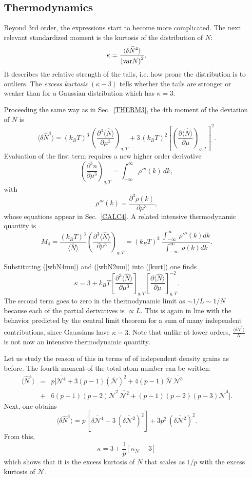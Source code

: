 \documentclass[aps,twocolumn,pra,superscriptaddress,nofootinbib,amsmath,amssymb,floats,floatfix,english]{revtex4-1}
\newcommand{\op}[1]{\widehat{#1}}
\newcommand{\mc}[1]{{\mathcal{#1}}}
\newcommand{\wb}[1]{{\overline{#1}}}
\newcommand{\nonu}{\nonumber}
\newcommand{\eqn}[1]{(\ref{#1})}
\renewcommand{\eq}[2]{\begin{equation}\label{#1}#2\end{equation}}
\newcommand{\eqa}[2]{\begin{eqnarray}#2\label{#1}\end{eqnarray}}
\begin{document}
\subsection{Thermodynamics}
\label{THERM4}
Beyond 3rd order, the expressions start to become more complicated. 
The next relevant standardized moment is the kurtosis of the distribution of $N$: 
\eq{kurt}{
\kappa =\frac{\langle\delta\op{N}^4\rangle}{\left({\rm var} N\right)^2}.
}
It describes the relative strength of the tails, i.e. how prone the distribution is to outliers. The \emph{excess kurtosis} $(\kappa-3)$ tells
whether the tails are stronger or weaker than for a Gaussian distribution which has $\kappa=3$.

Proceeding the same way as in Sec.~\ref{THERM3}, the 4th moment of the deviation of $N$ is 
\eq{wbN4mu}{
\langle\delta \op{N}^4\rangle = (k_BT)^3\,\left(\frac{\partial^3\langle \op{N}\rangle}{\partial\mu^3}\right)_{g,T} + 3\,(k_BT)^2\left[\left(\frac{\partial\langle \op{N}\rangle}{\partial\mu}\right)_{g,T}\right]^2.
}
Evaluation of the first term requires a new higher order derivative
\eq{dndu3}{
\left(\frac{\partial^3 n}{\partial\mu^3}\right)_{g,T} = \int_{-\infty}^{\infty} \rho'''(k)\, dk,
}
with
\eq{dpdu3}{
\rho'''(k) = \frac{\partial^3\rho(k)}{\partial\mu^3},
}
whose equations appear in Sec.~\ref{CALC4}. 
A related intensive thermodynamic quantity is 
\eq{Th4}{
M_4 = \frac{(k_BT)^3}{\langle \op{N}\rangle} \left(\frac{\partial^3\langle \op{N}\rangle}{\partial\mu^3}\right)_{g,T} = (k_BT)^3\ \frac{\int_{-\infty}^{\infty}\ \rho'''(k) dk}{\int_{-\infty}^{\infty}\ \rho(k) dk}.
}



Substituting \eqn{wbN4mu} and \eqn{wbN2mu} into \eqn{kurt} one finds
\eq{kurt2}{
\kappa = 3 + k_BT\left[\frac{\partial^3\langle \op{N}\rangle}{\partial\mu^3}\right]_{g,T}\left[\frac{\partial\langle \op{N}\rangle}{\partial\mu}\right]_{g,T}^{-2}.
}
The second term goes to zero in the thermodynamic limit as $\sim1/L \sim1/N$ because each of the partial derivatives is $\propto L$. 
This is again in line with the behavior predicted by the central limit theorem for a sum of many independent contributions, since Gaussians have $\kappa=3$. 
Note that unlike at lower orders, $\frac{\langle\delta \op{N}^4\rangle}{N}$ is not now an intensive thermodynamic quantity. 

Let us study the reason of this in terms of of independent density grains as before.
The fourth moment of the total atom number can be written:
\eqa{N4mc}{
\langle \op{N}^4\rangle  &=& 
 p \Big[\wb{\mc{N}^4} + 3(p-1)\left(\wb{\mc{N}}\right)^2 + 4(p-1)\wb{\mc{N}}\,\wb{\mc{N}^3} \\
&+& 6(p-1)(p-2)\wb{\mc{N}}^2\,\wb{\mc{N}^2}+(p-1)(p-2)(p-3)\wb{\mc{N}}^4\Big].\nonu
}
Next, one obtains
\eq{N4mc2}{
\langle\delta \op{N}^4\rangle = p\,\left[\wb{\delta\mc{N}^4} -3\,\left(\wb{\delta\mc{N}^2}\right)^2\right] + 3p^2\,\left(\wb{\delta\mc{N}^2}\right)^2.
}
From this,
\eq{mcK0}{
\kappa = 3 + \frac{1}{p}\left[\kappa_{\mc{N}}-3\right]
}
which shows that 
it is the excess kurtosis of $N$ that scales as $1/p$ with the excess kurtosis of $\mc{N}$.
\end{document}

